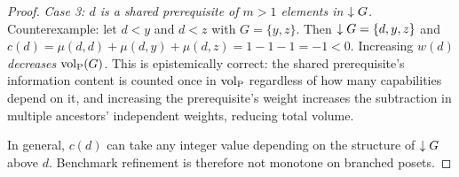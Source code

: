\begin{proof}
\emph{Case 3: $d$ is a shared prerequisite of $m > 1$ elements in $\downarrow G$.}
Counterexample: let $d < y$ and $d < z$ with $G = \{y, z\}$. Then
$\downarrow G = \{d, y, z\}$ and $c(d) = \mu(d, d) + \mu(d, y) + \mu(d, z) =
1 - 1 - 1 = -1 < 0$. Increasing $w(d)$ \emph{decreases} ${\operatorname{vol}_{\mathrm{P}}}(G)$. This is
epistemically correct: the shared prerequisite's information content is
counted once in ${\operatorname{vol}_{\mathrm{P}}}$ regardless of how many capabilities depend on it, and
increasing the prerequisite's weight increases the subtraction in multiple
ancestors' independent weights, reducing total volume.

In general, $c(d)$ can take any integer value depending on the structure of
$\downarrow G$ above $d$. Benchmark refinement is therefore not monotone on
branched posets.
\end{proof}
